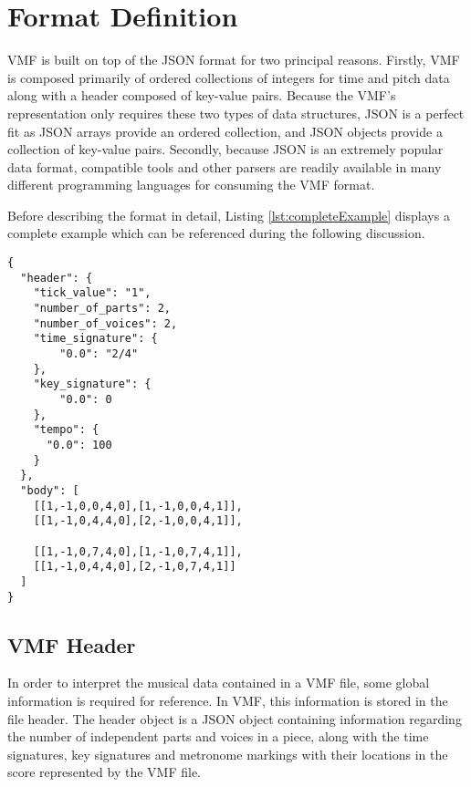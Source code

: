 
\section{Format Definition}

VMF is built on top of the JSON format for two principal reasons. Firstly, VMF is composed primarily of ordered collections of integers for time and pitch data along with a header composed of key-value pairs. Because the VMF's representation only requires these two types of data structures, JSON is a perfect fit as JSON arrays provide an ordered collection, and JSON objects provide a collection of key-value pairs. Secondly, because JSON is an extremely popular data format, compatible tools and other parsers are readily available in many different programming languages for consuming the VMF format.

Before describing the format in detail, Listing \ref{lst:completeExample} displays a complete example which can be referenced during the following discussion.

\begin{Verbatim}[fontfamily=courier, xleftmargin=\parindent]
{
  "header": {
    "tick_value": "1",
    "number_of_parts": 2,
    "number_of_voices": 2,
    "time_signature": {
        "0.0": "2/4"
    },
    "key_signature": {
        "0.0": 0
    },
    "tempo": {
      "0.0": 100
    }
  },
  "body": [
    [[1,-1,0,0,4,0],[1,-1,0,0,4,1]],
    [[1,-1,0,4,4,0],[2,-1,0,0,4,1]],

    [[1,-1,0,7,4,0],[1,-1,0,7,4,1]],
    [[1,-1,0,4,4,0],[2,-1,0,7,4,1]]
  ]
}
\end{Verbatim}

\subsection{VMF Header}

In order to interpret the musical data contained in a VMF file, some global information is required for reference. In VMF, this information is stored in the file header. The header object is a JSON object containing information regarding the number of independent parts and voices in a piece, along with the time signatures, key signatures and metronome markings with their locations in the score represented by the VMF file.